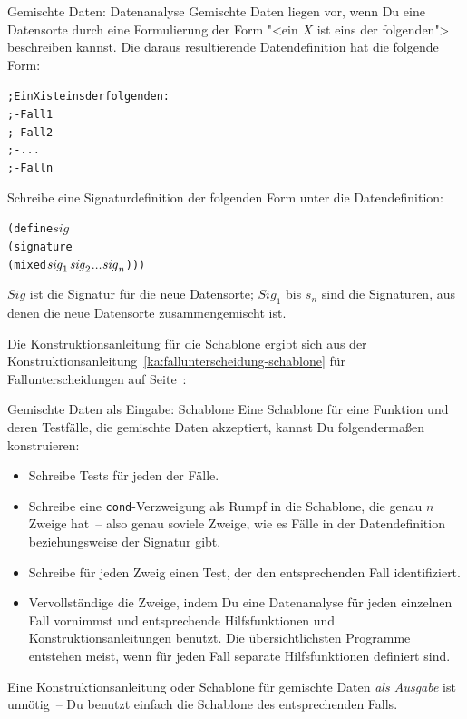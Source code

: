 \begin{konstruktionsanleitung}{Gemischte Daten: Datenanalyse}
  \label{ka:gemischt-datenanalyse}
Gemischte Daten liegen vor, wenn Du eine Datensorte durch eine
  Formulierung der Form "<ein $X$ ist eins der folgenden"> beschreiben
  kannst.  Die daraus resultierende Datendefinition hat die folgende
  Form:
\begin{alltt}
; Ein X ist eins der folgenden:
; - Fall 1
; - Fall 2
; - ...
; - Fall n
\end{alltt}
%
Schreibe eine Signaturdefinition der folgenden Form unter
die Datendefinition:
%
\begin{alltt}
(define \(\mathit{sig}\)
  (signature
    (mixed \(\mathit{sig}\sb{1}\) \(\mathit{sig}\sb{2}\) \(\ldots\) \(\mathit{sig}\sb{n}\))))
\end{alltt}
$\mathit{Sig}$ ist die Signatur für die neue Datensorte; $\mathit{Sig}_1$ bis $\textit{s}_n$
sind die Signaturen, aus denen die neue
Datensorte zusammengemischt ist.
\end{konstruktionsanleitung}
%
\noindent Die Konstruktionsanleitung für die Schablone ergibt sich aus
der Konstruktionsanleitung~\ref{ka:fallunterscheidung-schablone} für
Fallunterscheidungen auf Seite~\pageref{ka:fallunterscheidung-schablone}:
%
\begin{konstruktionsanleitung}{Gemischte Daten als Eingabe:
    Schablone}
  \label{ka:gemischt-eingabe-schablone}
Eine Schablone für eine Funktion und deren Testfälle, die gemischte
Daten akzeptiert, kannst Du folgendermaßen konstruieren:
%
\begin{itemize}
\item Schreibe Tests für jeden der Fälle.
\item  Schreibe eine \texttt{cond}-Verzweigung als Rumpf in die
  Schablone, die genau $n$ Zweige hat~-- also genau soviele Zweige,
  wie es Fälle in der Datendefinition beziehungsweise der Signatur gibt.
\item Schreibe für jeden Zweig einen Test, der den entsprechenden
  Fall identifiziert.
\item Vervollständige die Zweige, indem Du eine Datenanalyse für
  jeden einzelnen Fall vornimmst und entsprechende Hilfsfunktionen
  und Konstruktionsanleitungen benutzt.
  Die übersichtlichsten Programme entstehen meist, wenn für jeden Fall
  separate Hilfsfunktionen definiert sind.\label{page:separate-mixed-procs}
\end{itemize}
%
\end{konstruktionsanleitung}
%
Eine Konstruktionsanleitung oder Schablone für gemischte Daten
\emph{als Ausgabe} ist unnötig~-- Du benutzt einfach die Schablone
des entsprechenden Falls.

